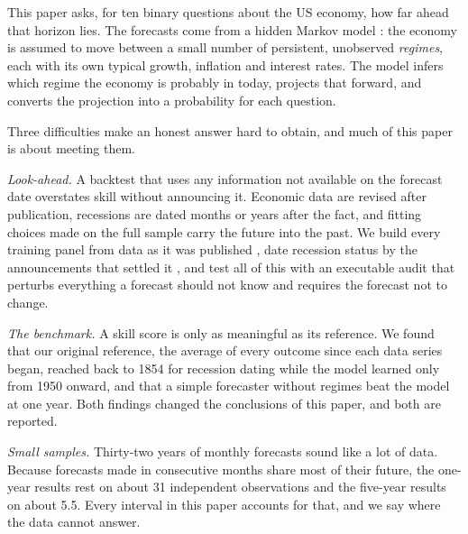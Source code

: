 \documentclass[11pt]{article}
\begin{document}
This paper asks, for ten binary questions about the US economy, how far ahead that horizon lies. The
forecasts come from a hidden Markov model \citep{hamilton1989new,rabiner1989tutorial}: the economy is
assumed to move between a small number of persistent, unobserved \emph{regimes}, each with its own
typical growth, inflation and interest rates. The model infers which regime the economy is probably in
today, projects that forward, and converts the projection into a probability for each question.

Three difficulties make an honest answer hard to obtain, and much of this paper is about meeting them.

\emph{Look-ahead.} A backtest that uses any information not available on the forecast date overstates
skill without announcing it. Economic data are revised after publication, recessions are dated months or
years after the fact, and fitting choices made on the full sample carry the future into the past. We
build every training panel from data as it was published \citep{croushore2001realtime}, date recession
status by the announcements that settled it \citep{nber2026announcements}, and test all of this with an
executable audit that perturbs everything a forecast should not know and requires the forecast not to
change.

\emph{The benchmark.} A skill score is only as meaningful as its reference. We found that our original
reference, the average of every outcome since each data series began, reached back to 1854 for
recession dating while the model learned only from 1950 onward, and that a simple forecaster without
regimes beat the model at one year. Both findings changed the conclusions of this paper, and both are
reported.

\emph{Small samples.} Thirty-two years of monthly forecasts sound like a lot of data. Because forecasts
made in consecutive months share most of their future, the one-year results rest on about 31
independent observations and the five-year results on about 5.5. Every interval in this paper accounts
for that, and we say where the data cannot answer.
\end{document}
